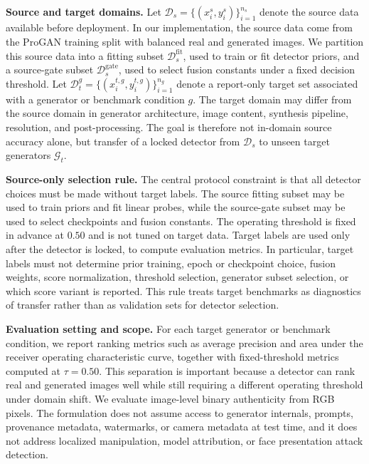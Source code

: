 \documentclass[lettersize,journal]{IEEEtran}
\begin{document}
\textbf{Source and target domains.}
Let $\mathcal{D}_{s}=\{(x_i^s,y_i^s)\}_{i=1}^{n_s}$ denote the source data available before deployment. In our implementation, the source data come from the ProGAN training split with balanced real and generated images. We partition this source data into a fitting subset $\mathcal{D}_{s}^{\mathrm{fit}}$, used to train or fit detector priors, and a source-gate subset $\mathcal{D}_{s}^{\mathrm{gate}}$, used to select fusion constants under a fixed decision threshold. Let $\mathcal{D}_{t}^{g}=\{(x_i^{t,g},y_i^{t,g})\}_{i=1}^{n_g}$ denote a report-only target set associated with a generator or benchmark condition $g$. The target domain may differ from the source domain in generator architecture, image content, synthesis pipeline, resolution, and post-processing. The goal is therefore not in-domain source accuracy alone, but transfer of a locked detector from $\mathcal{D}_{s}$ to unseen target generators $\mathcal{G}_{t}$.

\textbf{Source-only selection rule.}
The central protocol constraint is that all detector choices must be made without target labels. The source fitting subset may be used to train priors and fit linear probes, while the source-gate subset may be used to select checkpoints and fusion constants. The operating threshold is fixed in advance at $0.50$ and is not tuned on target data. Target labels are used only after the detector is locked, to compute evaluation metrics. In particular, target labels must not determine prior training, epoch or checkpoint choice, fusion weights, score normalization, threshold selection, generator subset selection, or which score variant is reported. This rule treats target benchmarks as diagnostics of transfer rather than as validation sets for detector selection.

\textbf{Evaluation setting and scope.}
For each target generator or benchmark condition, we report ranking metrics such as average precision and area under the receiver operating characteristic curve, together with fixed-threshold metrics computed at $\tau=0.50$. This separation is important because a detector can rank real and generated images well while still requiring a different operating threshold under domain shift. We evaluate image-level binary authenticity from RGB pixels. The formulation does not assume access to generator internals, prompts, provenance metadata, watermarks, or camera metadata at test time, and it does not address localized manipulation, model attribution, or face presentation attack detection.
\end{document}
